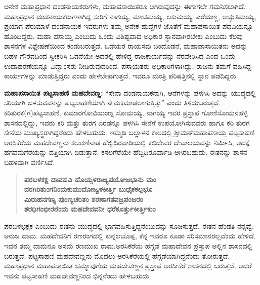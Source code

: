 ಅನೇಕ ಮಹಾಪ್ರಧಾನ ದಂಡನಾಯಕರುಗಳು, ಮಹಾಪಸಾಯಿತರೂ ಆಗಿರುವುದನ್ನು ಈಗಾಗಲೇ ಗಮನಿಸಲಾಗಿದೆ. ಮಹಾಪ್ರಧಾನ ದಂಡನಾಯಕರುಗಳಾಗಿದ್ದ ಸುರಿಗೆ ನಾಗಯ್ಯ, ಮಾಚಮಯ್ಯ, ಲಕುಮಯ್ಯ, ಎರೆಯಣ್ಣ, ಅಚ್ಯುತಿಮಯ್ಯ, ಪ್ರಯಾಗ ಪೆರುಮಾಳೆ ದಂಡನಾಯಕ ಇವರುಗಳು ತಮ್ಮ ಅನೇಕ ಹುದ್ದೆಗಳ ಜೊತೆಗೆ ಮಹಾಪಸಾಯಿತ ಪದವಿಯನ್ನೂ ಹೊಂದಿದ್ದರು. ಮಹಾ ಪಸಾಯ್ತ ಎಂಬುದು ಒಂದು ವಿಶಿಷ್ಟವಾದ ಅಧಿಕಾರ ಸ್ಥಾನವಾಗಿರಬೇಕು ಎಂಬುದು ಕೆಲವು ಶಾಸನಗಳ ವಿಶ್ಲೇಷಣೆಯಿಂದ ಕಂಡುಬರುತ್ತದೆ. ಒಡೆಯರ ರಾಯಸವು ಬಂದೊಡನೆ, ಮಹಾಪಾಸಾಯಿತನು ಅದನ್ನು ಬಹಳ ಗೌರವದಿಂದ ಸ್ವೀಕರಿಸಿ ಒಡನೆಯೇ ಅದರಲ್ಲಿ ಹೇಳಿದ್ದ ರಾಜಕಾರ್ಯವನ್ನು ನೆರವೇರಿಸಿದ ಎಂದ ಒಂದು ಉದಾಹರಣೆಯನ್ನೂ ವಿದ್ವಾಂಸರು ನೀಡಿರುವುದರಿಂದ. ಪಸಾಯತರು ಅಧಿಕಾರಿಗಳಾಗಿದ್ದು, ರಾಜನು ತಮಗೆ ವಹಿಸಿದ್ದ ಕಾರ್ಯಗಳನ್ನು ಮಾಡುತ್ತಿದ್ದರು ಎಂದು ಹೇಳಬೇಕಾಗುತ್ತದೆ. ಇವರೂ ಮಂತ್ರಿ ಪರಿಷತ್ತಿನಲ್ಲಿ ಸ್ಥಾನ ಪಡೆದಿದ್ದರು.

\textbf{ಮಹಾಪಸಾಯಿತ ಪಟ್ಟಸಾಹಣಿ ಮಹದೇವಣ್ಣ:} “ಸೇನಾ ದಂಡನಾಯಕನಾಗಿ, ಆನೆಗಳನ್ನು ಪಳಗಿಸಿ ಅದನ್ನು ಯುದ್ಧದಲ್ಲಿ ಸರಿಯಾಗಿ ಬಳಸುವವನನ್ನು ಪಟ್ಟಸಾಹಣಿಯಾಗಿ ನೇಮಕಮಾಡಲಾಗುತ್ತಿತ್ತು” ಎಂದು ತಿಳಿದುಬರುತ್ತದೆ. ಕರಿತುರಕ(ಗ)ಪಟ್ಟಸಾಹಣಿ, ಕುಮಾರಗೋವಿಯಂಣ್ನ ಸೋಮಯ್ಯ, ನಾಗಯ್ಯ ಇವರ ಪ್ರಸ್ತಾಪ ಗೋಣಿಸೋಮನಹಳ್ಳಿ ಶಾಸನದಲ್ಲಿದ್ದು, ಇವರು ಕರಿ ಮತ್ತು ತುರಗ ಎರಡನ್ನೂ ಪಳಗಿಸಿ ಸೇನೆಗೆ ಉಪಯೋಗಿಸುವವರು ಹಾಗೂ ಕರಿ ತುರಗ ಸೇನೆಯ ಮುಖ್ಯಸ್ಥರಾಗಿದ್ದರೆಂದು ಹೇಳಬಹುದು. ಇಮ್ಮಡಿ ಬಲ್ಲಾಳನ ಕಾಲದಲ್ಲಿ ಶ‍್ರೀಮನ್​ ಮಹಾಪಸಾಯ್ತ ಪಟ್ಟಸಾಹಣಿ ಅರಸಿಕೆರೆಯ ಮಹದೇವಣ್ಣನು ಕಲುಕಣಿನಾಡ ಹೆಬ್ಬಿದಿರವಾಡಿಯಲ್ಲಿ ಕಲಿದೇವರ ದೇವಾಲಯವನ್ನು ನಿರ್ಮಿಸಿ, ಅದಕ್ಕೆ ಹಗವಮಗೆರೆಯನ್ನು ದತ್ತಿಯಾಗಿ ಬಿಡುತ್ತಾನೆ. ಕಸಲಗೆರೆಯೇ ಹೆಬ್ಬಿದಿರೂರ್ವಾಡಿ ಆಗಿರಬಹುದು. ಈತನನ್ನು ಶಾಸನ ಬಹಳವಾಗಿ ವರ್ಣಿಸಿದೆ.

\begin{verse}
\textbf{ಪರಬಳಕಕ್ಷ ದಾವಹವಿ ಹೊಯ್ಸಳರಾಜ್ಯಪಯೋಜಭಾನು ಮಂ} \\\textbf{ದರಗಿರಿತುಂಗನಿಂದುಕುಮುದೋಜ್ವಳಕೀರ್ತ್ತಿ ಬುಧೈಕಕಲ್ಪಭೂ} \\\textbf{ಮಿರುಹನಗಣ್ಯ ಪುಂಣ್ಯಚರಿತಂ ಶರಣಾಗತವಜ್ರಪಂಜರಂ} \\\textbf{ಶರಧಿಗಂಭೀರನೆಂದು ಮಹದೇವವನೀ ಧರೆಕೂರ್ತ್ತುಕೀರ್ತ್ತಿಕುಂ}
\end{verse}

ಪರಬಳಭಕ್ಷಕ ಎಂಬುದು ಈತನು ಯುದ್ಧದಲ್ಲಿ ಭಾಗವಹಿಸುತ್ತಿದ್ದನೆಂಬುದನ್ನು ಸೂಚಿಸುತ್ತದೆ. ಈತನ ಹೆಂಡತಿ ನನ್ನವ್ವೆ. ಅನುಜ ದಾಮ. ಮಹದೇವನಿಗೆ ರಣರಂಗದಲ್ಲಿ ಕುನ್ನಲಬೊಪ್ಪ, ಕೆನ್ನ ಇವರೂ ಕೂಡಾ ಸರಿಸಮಾನರಲ್ಲವೆಂದು ಹೇಳಿದೆ. ಇವನ ತಮ್ಮ ದಾಮನೂ ಅಸಮ ರಣಮುಖ ರಾಮ.ಅರಸಿಕೆರೆಯ ಹೆಗ್ಗಡೆ ಮಹಾದೇವನ ಪ್ರಸ್ತಾಪ ಅಲ್ಲಿನ ಶಾಸನದಲ್ಲಿ ಬರುತ್ತದೆ. ಪಟ್ಟಸಾಹಣಿ ಮಹದೇವಣ್ಣನು ಮೊದಲು ಅರಸಿಕೆರೆಯಲ್ಲಿ ಹೆಗ್ಗಡೆಯಾಗಿದ್ದನೆಂದು ತೋರುತ್ತದೆ. ಮಹಾಪ್ರಧಾನ ಮಹಾಪಸಾಯಿತ ಚಮ್ಮಾವುಗೆಯ ಮಹದೇವಣ್ಣನ ಪ್ರಸ್ತಾಪ ಅರಸೀಕೆರೆ ಶಾಸನದಲ್ಲಿ ಬರುತ್ತದೆ. ಆದರೆ ಇವನು ಪಟ್ಟಸಾಹಣಿ ಮಹದೇವಣ್ಣನಿಂದ ಭಿನ್ನನೆಂದು ಹೇಳಬಹುದು.

